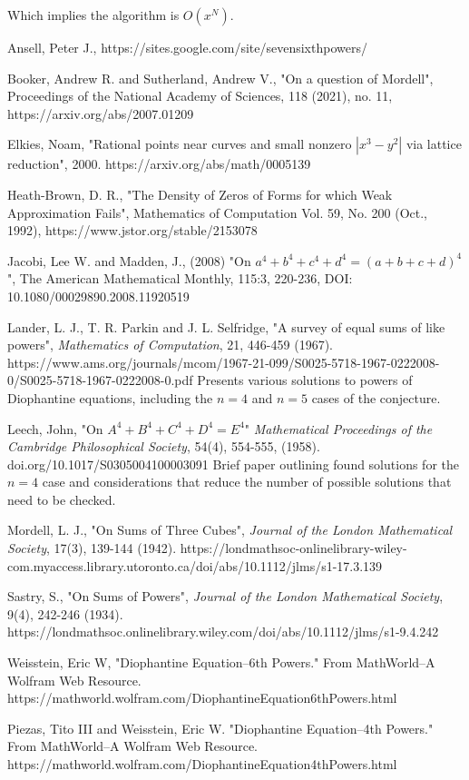 \documentclass{article}
\begin{document}
\begin{flushleft}
Which implies the algorithm is $O(x^N)$.




\begin{thebibliography}{9}

Ansell, Peter J., https://sites.google.com/site/sevensixthpowers/

Booker, Andrew R. and Sutherland, Andrew V., "On a question of Mordell", Proceedings of the National Academy of Sciences, 118 (2021), no. 11, https://arxiv.org/abs/2007.01209

Elkies, Noam, "Rational points near curves and small nonzero $|x^3-y^2|$ via lattice reduction", 2000. https://arxiv.org/abs/math/0005139

Heath-Brown, D. R., "The Density of Zeros of Forms for which Weak Approximation Fails", Mathematics of Computation
Vol. 59, No. 200 (Oct., 1992), https://www.jstor.org/stable/2153078


Jacobi, Lee W. and Madden, J., (2008) "On $a^4 + b^4+ c^4+ d^4 = (a + b + c + d)^4$", The American Mathematical Monthly, 115:3, 220-236, DOI: 10.1080/00029890.2008.11920519

Lander, L. J.,  T. R. Parkin and J. L. Selfridge,
       "A survey of equal sums of like powers", 
        \textit{Mathematics of Computation}, 21, 446-459 (1967). 
        https://www.ams.org/journals/mcom/1967-21-099/S0025-5718-1967-0222008-0/S0025-5718-1967-0222008-0.pdf 
        \subitem Presents various solutions to powers of Diophantine equations, including the $n=4$ and $n=5$ cases of the conjecture. 

Leech, John, "On $A^4 + B^4 + C^4 + D^4 = E^4$"
    \textit{Mathematical Proceedings of the Cambridge Philosophical Society}, 54(4), 554-555, (1958).
        doi.org/10.1017/S0305004100003091
        \subitem Brief paper outlining found solutions for the $n=4$ case and considerations that reduce the number of possible solutions that need to be checked.

Mordell, L. J., "On Sums of Three Cubes",
\textit{Journal of the London Mathematical Society}, 17(3), 139-144 (1942). 
https://londmathsoc-onlinelibrary-wiley-com.myaccess.library.utoronto.ca/doi/abs/10.1112/jlms/s1-17.3.139

Sastry, S., 
"On Sums of Powers", 
\textit{Journal of the London Mathematical Society}, 9(4), 242-246 (1934). 
https://londmathsoc.onlinelibrary.wiley.com/doi/abs/10.1112/jlms/s1-9.4.242

Weisstein, Eric W, "Diophantine Equation--6th Powers." From MathWorld--A Wolfram Web Resource. https://mathworld.wolfram.com/DiophantineEquation6thPowers.html

Piezas, Tito III and Weisstein, Eric W. "Diophantine Equation--4th Powers." From MathWorld--A Wolfram Web Resource. https://mathworld.wolfram.com/DiophantineEquation4thPowers.html

\end{thebibliography}
\end{flushleft}
\end{document}
